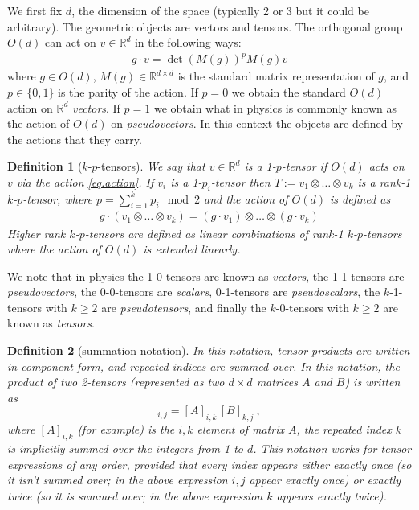 \documentclass{article}
\theoremstyle{plain}
\newtheorem{definition}{Definition}
\begin{document}
We first fix $d$, the dimension of the space (typically 2 or 3 but it could be arbitrary). The geometric objects are vectors and tensors. 
The orthogonal group $O(d)$ can act on $v \in \mathbb R^d$ in the following ways:
\begin{align} \label{eq.action}
    g\cdot v = \det(M(g))^p M(g) v 
\end{align}
where $g\in O(d)$, $M(g)\in \mathbb R^{d\times d}$ is the standard matrix representation of $g$, and $p\in\{0,1\}$ is the parity of the action. If $p=0$ we obtain the standard $O(d)$ action on $\mathbb R^d$ \emph{vectors}. If $p=1$ we obtain what in physics is commonly known as the action of $O(d)$ on \emph{pseudovectors}. In this context the objects are defined by the actions that they carry.

\begin{definition}[$k$-$p$-tensors] \label{def.tensors}
We say that $v\in \mathbb R^d$ is a 1-$p$-tensor if $O(d)$ acts on $v$ via the action \eqref{eq.action}. 
If $v_i$ is a 1-$p_i$-tensor then $T:=v_{1}\otimes\ldots \otimes v_k$ is a rank-1 $k$-$p$-tensor, where $p=\sum_{i=1}^k p_i \mod 2$ and the action of $O(d)$ is defined as
\begin{align}
    g\cdot (v_{1}\otimes\ldots \otimes v_k) = (g\cdot v_1)\otimes \ldots \otimes (g\cdot v_k)
\end{align}
Higher rank $k$-$p$-tensors are defined as linear combinations of rank-1  $k$-$p$-tensors where the action of $O(d)$ is extended linearly.
\end{definition}

We note that in physics the 1-0-tensors are known as \emph{vectors}, the 1-1-tensors are \emph{pseudovectors}, the 0-0-tensors are \emph{scalars}, 0-1-tensors are \emph{pseudoscalars}, the $k$-1-tensors with $k\geq 2$ are \emph{pseudotensors}, and finally the $k$-0-tensors with $k\geq 2$ are known as \emph{tensors}.


\begin{definition}[summation notation]
In this notation, tensor products are written in component form, and repeated indices are summed over.
In this notation, the product of two 2-tensors (represented as two $d\times d$ matrices $A$ and $B$) is written as
\begin{equation}
    [A\, B]_{i,j} = [A]_{i,k}\,[B]_{k,j} ~,
\end{equation}
where $[A]_{i,k}$ (for example) is the $i,k$ element of matrix $A$, the repeated index $k$ is implicitly summed over the integers from 1 to $d$.
This notation works for tensor expressions of any order, provided that every index appears either exactly once (so it isn't summed over; in the above expression $i, j$ appear exactly once) or exactly twice (so it is summed over; in the above expression $k$ appears exactly twice). 
\end{definition}
\end{document}

